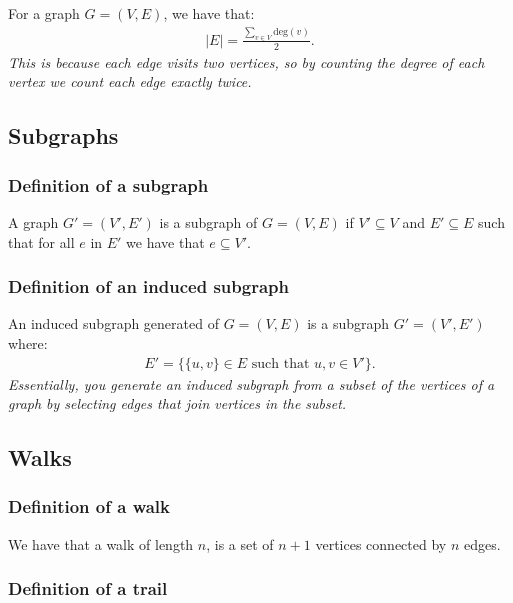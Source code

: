 \documentclass[a4paper, 12pt, twoside]{article}
\begin{document}
For a graph $G = (V, E)$, we have that: \begin{gather*}
  |E| = \frac{\sum_{v \in V} \text{deg}(v)}{2}.
\end{gather*} \textit{This is because each edge visits two vertices,
so by counting the degree of each vertex we count each edge exactly
twice.}

\subsection{Subgraphs}

\subsubsection{Definition of a subgraph}

A graph $G' = (V', E')$ is a subgraph of $G = (V, E)$ if
$V' \subseteq V$ and $E' \subseteq E$ such that for all $e$
in $E'$ we have that $e \subseteq V'$.

\subsubsection{Definition of an induced subgraph}

An induced subgraph generated of $G = (V, E)$
is a subgraph $G' = (V', E')$ where: \begin{gather*} 
  E' = \{\{u, v\} \in E \text{ such that } u, v \in V'\}.
\end{gather*} \textit{Essentially, you generate an induced
subgraph from a subset of the vertices of a graph by selecting
edges that join vertices in the subset.}

\newpage

\subsection{Walks}

\subsubsection{Definition of a walk}

We have that a walk of length $n$, is a set of
$n + 1$ vertices connected by $n$ edges.

\subsubsection{Definition of a trail}
\end{document}
